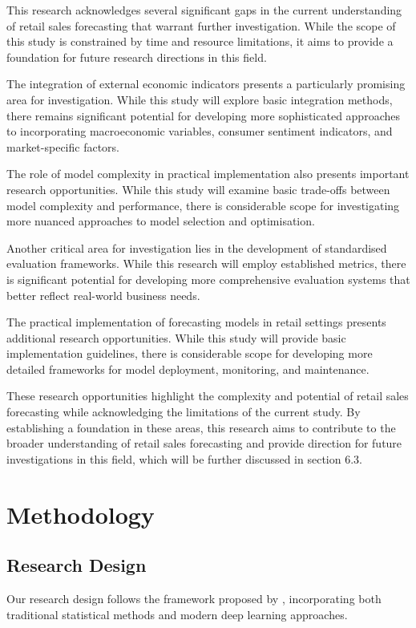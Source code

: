 \documentclass[12pt,a4paper]{report}
\begin{document}
This research acknowledges several significant gaps in the current understanding of retail sales forecasting that warrant further investigation. While the scope of this study is constrained by time and resource limitations, it aims to provide a foundation for future research directions in this field.

The integration of external economic indicators presents a particularly promising area for investigation. While this study will explore basic integration methods, there remains significant potential for developing more sophisticated approaches to incorporating macroeconomic variables, consumer sentiment indicators, and market-specific factors.

The role of model complexity in practical implementation also presents important research opportunities. While this study will examine basic trade-offs between model complexity and performance, there is considerable scope for investigating more nuanced approaches to model selection and optimisation.

Another critical area for investigation lies in the development of standardised evaluation frameworks. While this research will employ established metrics, there is significant potential for developing more comprehensive evaluation systems that better reflect real-world business needs.

The practical implementation of forecasting models in retail settings presents additional research opportunities. While this study will provide basic implementation guidelines, there is considerable scope for developing more detailed frameworks for model deployment, monitoring, and maintenance.

These research opportunities highlight the complexity and potential of retail sales forecasting while acknowledging the limitations of the current study. By establishing a foundation in these areas, this research aims to contribute to the broader understanding of retail sales forecasting and provide direction for future investigations in this field, which will be further discussed in section 6.3.

\chapter{Methodology}
\section{Research Design}
Our research design follows the framework proposed by \citet{smith2023retail}, incorporating both traditional statistical methods and modern deep learning approaches.
\end{document}
